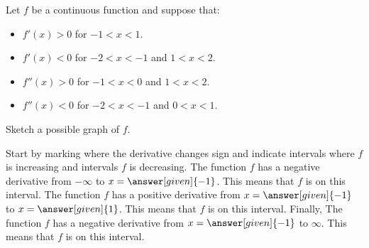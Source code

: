 \documentclass{ximera}
\begin{document}
\begin{example}
  Let $f$ be a continuous function and suppose that:
  \begin{itemize}
  \item $f'(x) > 0$ for $-1< x<1$.
  \item $f'(x) < 0$ for $-2< x<-1$ and $1<x<2$.
  \item $f''(x) > 0$ for $-1<x<0$ and $1<x< 2$.
  \item $f''(x) < 0$ for $-2<x<-1$ and $0<x< 1$.  
  \end{itemize}
  Sketch a possible graph of $f$.
  \begin{explanation}
    Start by marking where the derivative changes sign and indicate
    intervals where $f$ is increasing and intervals $f$ is
    decreasing. The function $f$ has a negative derivative from
    $-\infty$ to $x=\answer[given]{-1}$. This means that $f$ is
     on
    this interval. The function $f$ has a positive derivative from
    $x=\answer[given]{-1}$ to $x=\answer[given]{1}$. This means that $f$ is
     on
    this interval. Finally,  The function $f$ has a negative derivative from
    $x=\answer[given]{-1}$ to $\infty$. This means that $f$ is
     on
    this interval. 
  \begin{image}
\end{image}
\end{explanation}
\end{example}
\end{document}

